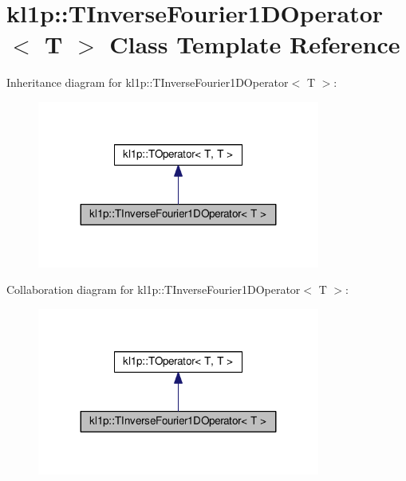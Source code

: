 \hypertarget{classkl1p_1_1TInverseFourier1DOperator}{}\section{kl1p\+:\+:T\+Inverse\+Fourier1\+D\+Operator$<$ T $>$ Class Template Reference}
\label{classkl1p_1_1TInverseFourier1DOperator}


Inheritance diagram for kl1p\+:\+:T\+Inverse\+Fourier1\+D\+Operator$<$ T $>$\+:
\nopagebreak
\begin{figure}[H]
\begin{center}
\leavevmode
\includegraphics[width=263pt]{classkl1p_1_1TInverseFourier1DOperator__inherit__graph}
\end{center}
\end{figure}


Collaboration diagram for kl1p\+:\+:T\+Inverse\+Fourier1\+D\+Operator$<$ T $>$\+:
\nopagebreak
\begin{figure}[H]
\begin{center}
\leavevmode
\includegraphics[width=263pt]{classkl1p_1_1TInverseFourier1DOperator__coll__graph}
\end{center}
\end{figure}
